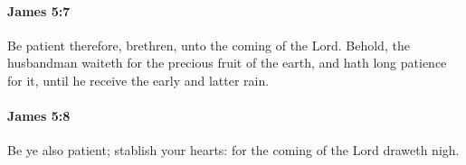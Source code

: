 		\paragraph{James 5:7} %
			\label{JAMES-5-7}

			Be patient therefore, brethren, unto the coming of the Lord. Behold, the husbandman waiteth for the precious fruit of the earth, and hath long patience for it, until he receive the early and latter rain.

			\begin{framed}
			\scriptsize
				\begin{compactdesc}
					\item[SBLG] 
				\end{compactdesc}
			\end{framed}

		\paragraph{James 5:8} %
			\label{JAMES-5-8}

			Be ye also patient; stablish your hearts: for the coming of the Lord draweth nigh.

